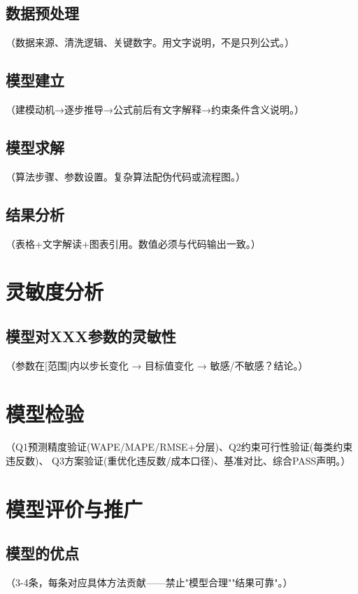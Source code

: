 \documentclass[12pt,a4paper]{article}
\numberwithin{equation}{section}
\numberwithin{figure}{section}
\numberwithin{table}{section}
\begin{document}
\subsection{数据预处理}
（数据来源、清洗逻辑、关键数字。用文字说明，不是只列公式。）

\subsection{模型建立}
（建模动机→逐步推导→公式前后有文字解释→约束条件含义说明。）

\subsection{模型求解}
（算法步骤、参数设置。复杂算法配伪代码或流程图。）

\subsection{结果分析}
（表格+文字解读+图表引用。数值必须与代码输出一致。）


\section{灵敏度分析}
\subsection{模型对XXX参数的灵敏性}
（参数在[范围]内以步长变化 → 目标值变化 → 敏感/不敏感？结论。）

\section{模型检验}
（Q1预测精度验证(WAPE/MAPE/RMSE+分层)、Q2约束可行性验证(每类约束违反数)、
Q3方案验证(重优化违反数/成本口径)、基准对比、综合PASS声明。）

\section{模型评价与推广}
\subsection{模型的优点}
（3-4条，每条对应具体方法贡献——禁止"模型合理""结果可靠"。）
\end{document}
